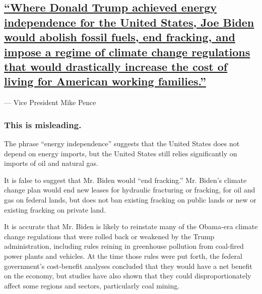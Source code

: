 \hypertarget{where-donald-trump-achieved-energy-independence-for-the-united-states-joe-biden-would-abolish-fossil-fuels-end-fracking-and-impose-a-regime-of-climate-change-regulations-that-would-drastically-increase-the-cost-of-living-for-american-working-families}{%
\subsection{\texorpdfstring{\protect\hyperlink{where-donald-trump-achieved-energy-independence-for-the-united-states-joe-biden-would-abolish-fossil-fuels-end-fracking-and-impo}{``Where
Donald Trump achieved energy independence for the United States, Joe
Biden would abolish fossil fuels, end fracking, and impose a regime of
climate change regulations that would drastically increase the cost of
living for American working
families.''}}{``Where Donald Trump achieved energy independence for the United States, Joe Biden would abolish fossil fuels, end fracking, and impose a regime of climate change regulations that would drastically increase the cost of living for American working families.''}}\label{where-donald-trump-achieved-energy-independence-for-the-united-states-joe-biden-would-abolish-fossil-fuels-end-fracking-and-impose-a-regime-of-climate-change-regulations-that-would-drastically-increase-the-cost-of-living-for-american-working-families}}

--- Vice President Mike Pence

\hypertarget{this-is-misleading-2}{%
\subsubsection{This is misleading.}\label{this-is-misleading-2}}

The phrase ``energy independence'' suggests that the United States does
not depend on energy imports, but the United States still relies
significantly on imports of oil and natural gas.

It is false to suggest that Mr. Biden would ``end fracking.'' Mr.
Biden's climate change plan would end new leases for hydraulic
fracturing or fracking, for oil and gas on federal lands, but does not
ban existing fracking on public lands or new or existing fracking on
private land.

It is accurate that Mr. Biden is likely to reinstate many of the
Obama-era climate change regulations that were rolled back or weakened
by the Trump administration, including rules reining in greenhouse
pollution from coal-fired power plants and vehicles. At the time those
rules were put forth, the federal government's cost-benefit analyses
concluded that they would have a net benefit on the economy, but studies
have also shown that they could disproportionately affect some regions
and sectors, particularly coal mining.

